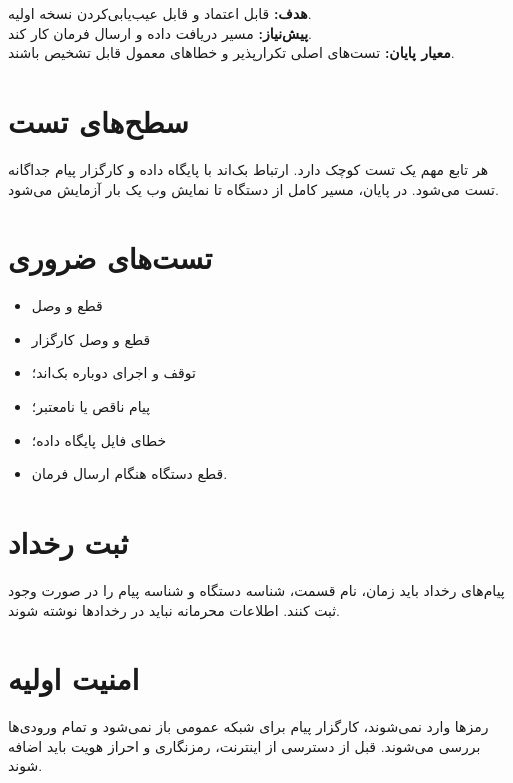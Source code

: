 \begin{phasebox}
\textbf{هدف:} قابل اعتماد و قابل عیب‌یابی‌کردن نسخه اولیه.\\
\textbf{پیش‌نیاز:} مسیر دریافت داده و ارسال فرمان کار کند.\\
\textbf{معیار پایان:} تست‌های اصلی تکرارپذیر و خطاهای معمول قابل تشخیص باشند.
\end{phasebox}

\section{سطح‌های تست}
هر تابع مهم یک تست کوچک دارد. ارتباط بک‌اند با پایگاه داده و کارگزار پیام جداگانه تست می‌شود. در پایان، مسیر کامل از دستگاه تا نمایش وب یک بار آزمایش می‌شود.

\section{تست‌های ضروری}
\begin{itemize}
    \item قطع و وصل
    \item قطع و وصل کارگزار
    \item توقف و اجرای دوباره بک‌اند؛
    \item پیام ناقص یا نامعتبر؛
    \item خطای فایل پایگاه داده؛
    \item قطع دستگاه هنگام ارسال فرمان.
\end{itemize}

\section{ثبت رخداد}
پیام‌های رخداد باید زمان، نام قسمت، شناسه دستگاه و شناسه پیام را در صورت وجود ثبت کنند. اطلاعات محرمانه نباید در رخدادها نوشته شوند.

\section{امنیت اولیه}
رمزها وارد
نمی‌شوند، کارگزار پیام برای شبکه عمومی باز نمی‌شود و تمام ورودی‌ها بررسی می‌شوند. قبل از دسترسی از اینترنت، رمزنگاری
و احراز هویت باید اضافه شوند.
